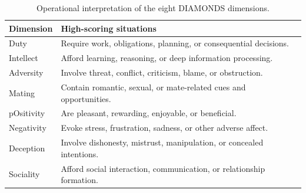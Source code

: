 \documentclass[11pt]{article}
\begin{document}
\begin{table}[H]
\centering
\caption{Operational interpretation of the eight DIAMONDS dimensions.}
\label{tab:diamonds_definitions}
\footnotesize
\begin{tabularx}{\linewidth}{lX}
\toprule
\textbf{Dimension} & \textbf{High-scoring situations} \\
\midrule
Duty & Require work, obligations, planning, or consequential decisions. \\
Intellect & Afford learning, reasoning, or deep information processing. \\
Adversity & Involve threat, conflict, criticism, blame, or obstruction. \\
Mating & Contain romantic, sexual, or mate-related cues and opportunities. \\
pOsitivity & Are pleasant, rewarding, enjoyable, or beneficial. \\
Negativity & Evoke stress, frustration, sadness, or other adverse affect. \\
Deception & Involve dishonesty, mistrust, manipulation, or concealed intentions. \\
Sociality & Afford social interaction, communication, or relationship formation. \\
\bottomrule
\end{tabularx}
\end{table}

\begin{table}[h]
\centering
\caption{Distribution of expert DIAMONDS ratings across the 64 scenarios. Each row sums to 64.}
\label{tab:diamonds_distribution}


\end{table}
\end{document}

